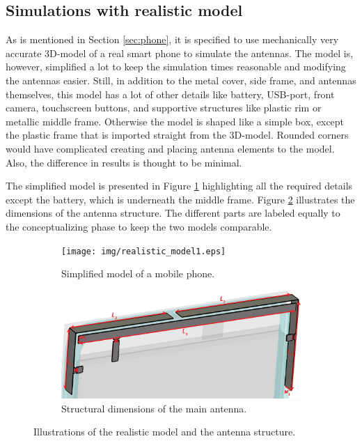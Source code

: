 \subsection{Simulations with realistic model}
\label{sec:sim_realistic}
As is mentioned in Section \ref{sec:phone}, it is specified to use mechanically very accurate 3D-model of a real smart phone to simulate the antennas. The model is, however, simplified a lot to keep the simulation times reasonable and modifying the antennas easier. Still, in addition to the metal cover, side frame, and antennas themselves, this model has a lot of other details like battery, USB-port, front camera, touchscreen buttons, and supportive structures like plastic rim or metallic middle frame. Otherwise the model is shaped like a simple box, except the plastic frame that is imported straight from the 3D-model. Rounded corners would have complicated creating and placing antenna elements to the model. Also, the difference in results is thought to be minimal. 

The simplified model is presented in Figure \ref{fig:realistic_model1} highlighting all the required details except the battery, which is underneath the middle frame. Figure \ref{fig:realistic_model2} illustrates the dimensions of the antenna structure. The different parts are labeled equally to the conceptualizing phase to keep the two models comparable.
\begin{figure}[H]
    \centering
    \begin{subfigure}[b]{0.5\textwidth}
        \texttt{[image: img/realistic\_model1.eps]}
        \caption{Simplified model of a mobile phone.}
        \label{fig:realistic_model1}
    \end{subfigure}
    
    \begin{subfigure}[b]{0.5\textwidth}
        \includegraphics[width=\textwidth]{img/realistic_model2.eps}
        \caption{Structural dimensions of the main antenna.}
        \label{fig:realistic_model2}
    \end{subfigure}
    \caption{Illustrations of the realistic model and the antenna structure.}
    \label{fig:realistic_model}
\end{figure}

